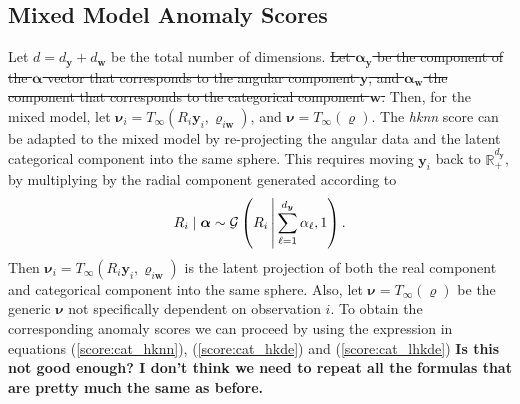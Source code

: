 \subsection{Mixed Model Anomaly Scores\label{sec:mixedscores}}
Let $d = d_{\bm{y}} + d_{\bm{w}}$ be the total number of dimensions.  \st{Let 
    $\bm{\alpha}_{\bm{y}}$ be the component of the $\bm{\alpha}$ vector that 
    corresponds  to the angular component $\bm{y}$, and $\bm{\alpha}_{\bm{w}}$ 
    the component that corresponds to the categorical component $\bm{w}$.}
    Then, for the mixed model, let 
    $\bm{\nu}_i = T_{\infty}(R_i\bm{y}_i, \bm{\varrho}_{i\bm{w}})$, and 
    $\bm{\nu} = T_{\infty}(\bm{\varrho})$.  The \emph{hknn} score can be adapted 
    to the mixed model by re-projecting the angular data and the latent 
    categorical component into the same sphere. This requires moving $\bm{y}_i$ 
    back to $\mathbb{R}_+^{d_{\bm{y}}}$, by multiplying by the radial component
    generated according to
    \begin{equation}
        \label{eqn:angularradial}
        R_i\mid\bm{\alpha} \sim \mathcal{G}
        \left(R_i\,\middle\vert\,\sum_{\ell = 1}^{d_{\bm{y}}}\alpha_{\ell}, 1\right).
    \end{equation}
    Then $\bm{\nu}_i = T_{\infty}(R_i\bm{y}_i, \bm{\varrho}_{i\bm{w}})$ is the 
    latent projection of both the real component and categorical component into 
    the same sphere.   Also, let $\bm{\nu} = T_{\infty}(\bm{\varrho})$ be the 
    generic $\bm{\nu}$ not specifically dependent on observation $i$.  To obtain the 
    corresponding anomaly scores we can proceed by using the expression in equations
    (\ref{score:cat_hknn}), (\ref{score:cat_hkde}) and (\ref{score:cat_lhkde})  {\bf Is
    this not good enough? I don't think we need to repeat all the formulas that are 
    pretty much the same as before.}

